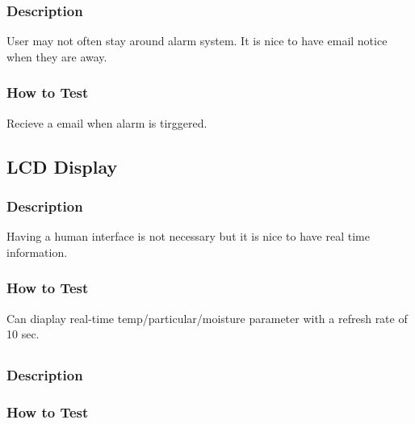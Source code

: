 \documentclass[letterpaper,12pt,notitlepage]{article}
\begin{document}
		\subsubsection{Description}
			\par User may not often stay around alarm system. It is nice to have email notice when they are away. 
		\subsubsection{How to Test}
			\par Recieve a email when alarm is tirggered. 


	\subsection{LCD Display}
		\subsubsection{Description}
			\par Having a human interface is not necessary but it is nice to have real time information. 
		\subsubsection{How to Test}
			\par Can diaplay real-time temp/particular/moisture parameter with a refresh rate of 10 sec. 


	\subsection{}
		\subsubsection{Description}
			\par 
		\subsubsection{How to Test}
			\par 
\end{document}
